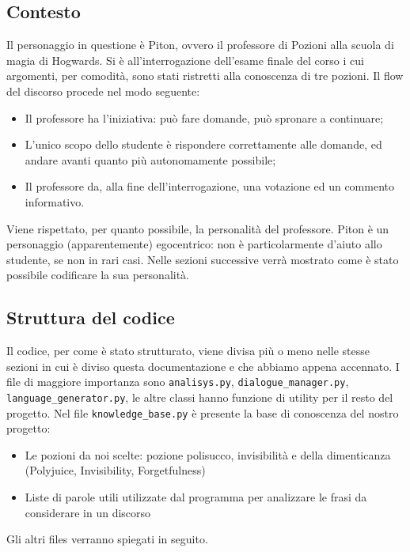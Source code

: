 \subsection{Contesto}
Il personaggio in questione è Piton, ovvero il professore di Pozioni alla scuola di magia di Hogwards. Si è all'interrogazione dell'esame finale del corso i cui argomenti, per comodità, sono stati ristretti alla conoscenza di tre pozioni. Il flow del discorso procede nel modo seguente:
\begin{itemize}
    \item Il professore ha l'iniziativa: può fare domande, può spronare a continuare;
    \item L'unico scopo dello studente è rispondere correttamente alle domande, ed andare avanti quanto più autonomamente possibile;
    \item Il professore da, alla fine dell'interrogazione, una votazione ed un commento informativo.
\end{itemize}
Viene rispettato, per quanto possibile, la personalità del professore. Piton è un personaggio (apparentemente) egocentrico: non è particolarmente d'aiuto allo studente, se non in rari casi. Nelle sezioni successive verrà mostrato come è stato possibile codificare la sua personalità.

\subsection{Struttura del codice}
Il codice, per come è stato strutturato, viene divisa più o meno nelle stesse sezioni in cui è diviso questa documentazione e che abbiamo appena accennato. I file di maggiore importanza sono \texttt{analisys.py}, \texttt{dialogue\_manager.py}, \texttt{language\_generator.py}, le altre classi hanno funzione di utility per il resto del progetto.
Nel file \texttt{knowledge\_base.py} è presente la base di conoscenza del nostro progetto:
\begin{itemize}
    \item Le pozioni da noi scelte: pozione polisucco, invisibilità e della dimenticanza (Polyjuice, Invisibility, Forgetfulness)
    \item Liste di parole utili utilizzate dal programma per analizzare le frasi da considerare in un discorso
\end{itemize}
Gli altri files verranno spiegati in seguito.

